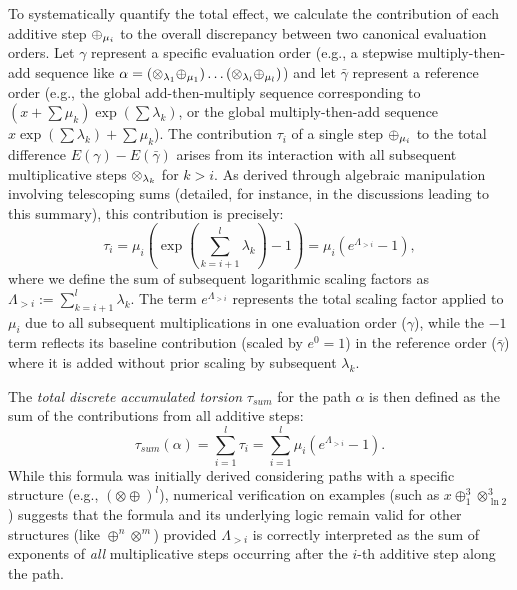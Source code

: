 To systematically quantify the total effect, we calculate the contribution of each additive step $\oplus_{\mu_i}$ to the overall discrepancy between two canonical evaluation orders. Let $\gamma$ represent a specific evaluation order (e.g., a stepwise multiply-then-add sequence like $\alpha = (\otimes_{\lambda_1} \oplus_{\mu_1}) \dots (\otimes_{\lambda_l} \oplus_{\mu_l})$) and let $\bar{\gamma}$ represent a reference order (e.g., the global add-then-multiply sequence corresponding to $(x+\sum \mu_k) \exp(\sum \lambda_k)$, or the global multiply-then-add sequence $x \exp(\sum \lambda_k) + \sum \mu_k$). The contribution $\tau_i$ of a single step $\oplus_{\mu_i}$ to the total difference $E(\gamma) - E(\bar{\gamma})$ arises from its interaction with all subsequent multiplicative steps $\otimes_{\lambda_k}$ for $k > i$. As derived through algebraic manipulation involving telescoping sums (detailed, for instance, in the discussions leading to this summary), this contribution is precisely:
\begin{equation}
\tau_i = \mu_i \left( \exp\left(\sum_{k=i+1}^{l} \lambda_k\right) - 1 \right) = \mu_i (e^{\Lambda_{>i}} - 1),
\label{eq:tau_i_contribution}
\end{equation}
where we define the sum of subsequent logarithmic scaling factors as $\Lambda_{>i} := \sum_{k=i+1}^{l} \lambda_k$. The term $e^{\Lambda_{>i}}$ represents the total scaling factor applied to $\mu_i$ due to all subsequent multiplications in one evaluation order ($\gamma$), while the $-1$ term reflects its baseline contribution (scaled by $e^0=1$) in the reference order ($\bar{\gamma}$) where it is added without prior scaling by subsequent $\lambda_k$.

The \emph{total discrete accumulated torsion} $\tau_{sum}$ for the path $\alpha$ is then defined as the sum of the contributions from all additive steps:
\begin{equation}
\tau_{sum}(\alpha) = \sum_{i=1}^{l} \tau_i = \sum_{i=1}^{l} \mu_i (e^{\Lambda_{>i}} - 1).
\label{eq:tau_sum_discrete}
\end{equation}
While this formula was initially derived considering paths with a specific structure (e.g., $(\otimes \oplus)^l$), numerical verification on examples (such as $x \oplus_1^3 \otimes_{\ln 2}^3$) suggests that the formula and its underlying logic remain valid for other structures (like $\oplus^n \otimes^m$) provided $\Lambda_{>i}$ is correctly interpreted as the sum of exponents of \emph{all} multiplicative steps occurring after the $i$-th additive step along the path.

